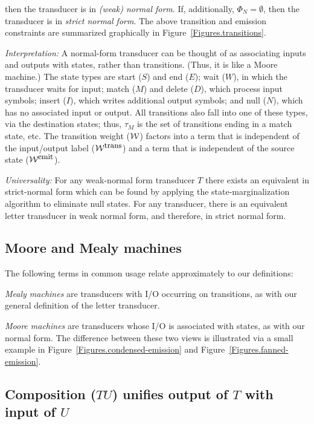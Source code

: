 \documentclass{article}
\newcommand{\seclabel}[1]{\label{sec.#1}}
\newcommand{\figref}[1]{Figure~\ref{Figures.#1}}
\newcommand\compose{}
\newcommand\States{\Phi}
\newcommand\Transitions{\tau}
\newcommand\weight{{\cal W}}
\newcommand\weightfunof[1]{\weight_{#1}}
\newcommand\transweightfun[1]{\weightfunof{#1}^{\mbox{\small trans}}}
\newcommand\emitweightfun[1]{\weightfunof{#1}^{\mbox{\small emit}}}
\newcommand\statesoftype[1]{\States_{#1}}
\begin{document}
then the transducer is in {\em (weak) normal form}.
If, additionally, $\statesoftype{N} = \emptyset$, then the transducer is in {\em strict normal form}.
The above transition and emission constraints are summarized graphically in \figref{transitions}. 


{\em Interpretation:}
A normal-form transducer can be thought of as associating inputs and outputs with states, rather than transitions.
(Thus, it is like a Moore machine.)
The state types are
 start ($S$) and end ($E$);
 wait ($W$), in which the transducer waits for input;
 match ($M$) and delete ($D$), which process input symbols;
 insert ($I$), which writes additional output symbols; and
 null ($N$), which has no associated input or output.
All transitions also fall into one of these types, via the destination states;
thus, $\Transitions_M$ is the set of transitions ending in a match state, etc.
The transition weight ($\weight$) factors into a term that is independent of the input/output label ($\transweightfun{}$)
and a term that is independent of the source state ($\emitweightfun{}$).

{\em Universality:}
For any weak-normal form transducer $T$ there exists an equivalent in strict-normal form which can be found by applying the state-marginalization algorithm to eliminate null states.
For any transducer, there is an equivalent letter transducer in weak normal form, and therefore, in strict normal form.

\subsection{Moore and Mealy machines}

The following terms in common usage relate approximately to our definitions:

{\em Mealy machines} are transducers with I/O occurring on transitions, as with our general definition of the letter transducer.

{\em Moore machines} are transducers whose I/O is associated with states, as with our normal form.
The difference between these two views is illustrated via a small example in
\figref{condensed-emission} and \figref{fanned-emission}.  

\subsection{Composition ($T\compose U$) unifies output of $T$ with input of $U$}
\seclabel{Composition}
\end{document}
